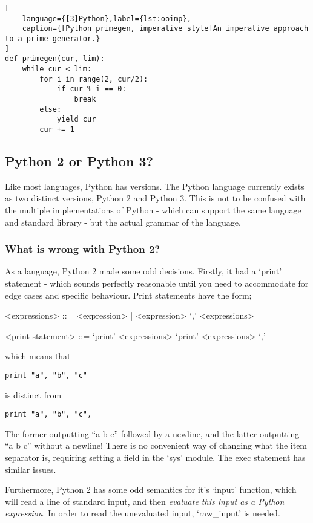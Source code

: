 \documentclass[10pt,a4paper,notitlepage]{report}
\begin{document}
\begin{lstlisting}[
	language={[3]Python},label={lst:ooimp},
	caption={[Python primegen, imperative style]An imperative approach to a prime generator.}
]
def primegen(cur, lim):
    while cur < lim:
        for i in range(2, cur/2):
            if cur % i == 0:
                break
        else:
            yield cur
        cur += 1

\end{lstlisting}

\subsection{Python 2 or Python 3?}
Like most languages, Python has versions. The Python language currently exists as two distinct versions, Python 2 and Python 3. This is not to be confused with the multiple implementations of Python - which can support the same language and standard library - but the actual grammar of the language.

\subsubsection{What is wrong with Python 2?}
As a language, Python 2 made some odd decisions. Firstly, it had a `print' statement - which sounds perfectly reasonable until you need to accommodate for edge cases and specific behaviour. Print statements have the form;
\begin{grammar}
<expressions> ::= <expression> | <expression> `,' <expressions>

<print statement> ::= `print' <expressions>
\alt `print' <expressions> `,'
\end{grammar}

which means that
\begin{lstlisting}[language={[2]Python}]
print "a", "b", "c"
\end{lstlisting}

is distinct from
\begin{lstlisting}[language={[2]Python}]
print "a", "b", "c",
\end{lstlisting}

The former outputting ``a b c'' followed by a newline, and the latter outputting ``a b c'' without a newline! There is no convenient way of changing what the item separator is, requiring setting a field in the `sys' module. The exec statement has similar issues.

Furthermore, Python 2 has some odd semantics for it's `input' function, which will read a line of standard input, and then \emph{evaluate this input as a Python expression}. In order to read the unevaluated input, `raw_input' is needed.
\end{document}
